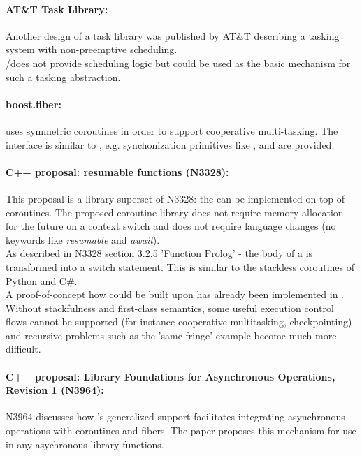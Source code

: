 \paragraph*{AT\&T Task Library:}
Another design of a task library was published by AT\&T\cite{atnt1989}
describing a tasking system with non-preemptive scheduling.\\
\pushcoro/\pullcoro does not provide scheduling logic but could be used as the
basic mechanism for such a tasking abstraction.

\paragraph*{boost.fiber:}
\boostfiber uses symmetric coroutines in order to support cooperative multi-tasking.
The interface is similar to , e.g. synchonization primitives
like , and  are provided.

\paragraph*{C++ proposal: resumable functions (N3328\cite{n3328}):}
This proposal is a library superset of N3328: the \resumfn can be implemented
on top of coroutines. The proposed coroutine library does not require memory allocation
for the future on a context switch and does not require language changes (no keywords
like \textit{resumable} and \textit{await}).\\
As described in N3328 section 3.2.5 'Function Prolog' - the body of a \resumfn is
transformed into a switch statement. This is similar to the stackless coroutines
of Python and C\#.\\
A proof-of-concept how \await could be built upon \boostcoroutine has already been
implemented in \awaitemu.\\
\newline
Without stackfulness and first-class semantics, some useful execution control
flows cannot be supported (for instance cooperative multitasking,
checkpointing) and recursive problems such as the 'same fringe' example become
much more difficult.

\paragraph*{C++ proposal: Library Foundations for Asynchronous Operations,
Revision 1
(N3964\cite{n3964}):}
N3964 discusses how \boostasio's generalized  support
facilitates integrating asynchronous operations with coroutines and fibers.
The paper proposes this mechanism for use in any asychronous library functions.
